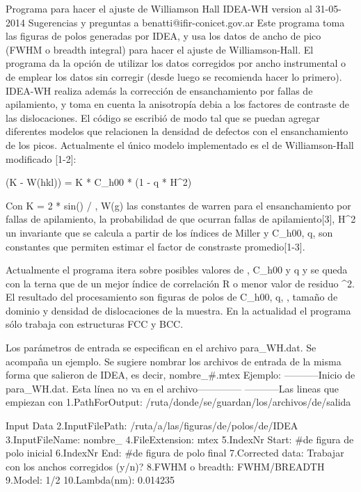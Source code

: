 Programa para hacer el ajuste de Williamson Hall IDEA-WH version al 31-05-2014
Sugerencias y preguntas a benatti@ifir-conicet.gov.ar
Este programa toma las figuras de polos generadas por IDEA, y usa los datos de ancho de pico (FWHM o breadth integral) para hacer el ajuste de Williamson-Hall.
El programa da la opción de utilizar los datos corregidos por ancho instrumental o de emplear los datos sin corregir (desde luego se recomienda hacer lo primero).
IDEA-WH realiza además la corrección de ensanchamiento por fallas de apilamiento, y toma en cuenta la anisotropía debia a los factores de contraste de las dislocaciones.
El código se escribió de modo tal que se puedan agregar diferentes modelos que relacionen la densidad de defectos con el ensanchamiento de los picos.
Actualmente el único modelo implementado es el de Williamson-Hall modificado [1-2]:

(\Delta K - \delta * W(hkl)) = K * C_{h00} * (1 - q * H^2)

Con K = 2 * sin(\theta) / \lambda, W(g) las constantes de warren para el ensanchamiento por fallas de apilamiento, \delta la probabilidad de que ocurran fallas de apilamiento[3],
H^2 un invariante que se calcula a partir de los índices de Miller y  C_{h00}, q, son constantes que permiten estimar el factor de constraste promedio[1-3].

Actualmente el programa itera sobre posibles valores de \delta, C_{h00} y q y se queda con la terna que de un mejor índice de correlación R o menor valor de residuo \chi^2.
El resultado del procesamiento son figuras de polos de C_{h00}, q, \delta, tamaño de dominio y densidad de dislocaciones de la muestra. En la actualidad el programa sólo trabaja con estructuras FCC y BCC.

Los parámetros de entrada se especifican en el archivo para_WH.dat. Se acompaña un ejemplo. Se sugiere nombrar los archivos de entrada de la misma forma que salieron de IDEA, es decir, nombre_#.mtex
Ejemplo:
-----------Inicio de para_WH.dat. Esta línea no va en el archivo--------------
-----------Las lineas que empiezan con %
1.PathForOutput: /ruta/donde/se/guardan/los/archivos/de/salida

Input Data
2.InputFilePath: /ruta/a/las/figuras/de/polos/de/IDEA
3.InputFileName: nombre_
4.FileExtension: mtex
5.IndexNr Start:  #de figura de polo inicial
6.IndexNr End:    #de figura de polo final
7.Corrected data: Trabajar con los anchos corregidos (y/n)?
8.FWHM o breadth: FWHM/BREADTH
9.Model:          1/2
10.Lambda(nm):    0.014235

